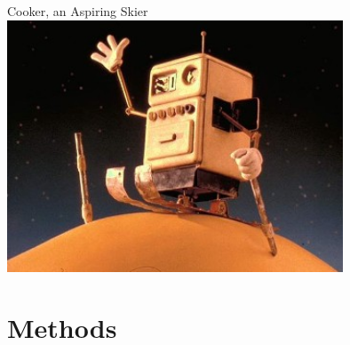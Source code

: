 \documentclass{beamer}
\begin{document}
    \begin{frame}{Cooker, an Aspiring Skier}
        \centering
        \includegraphics[width=0.75\textwidth]{skier}
    \end{frame}

    \section{Methods}
\end{document}
